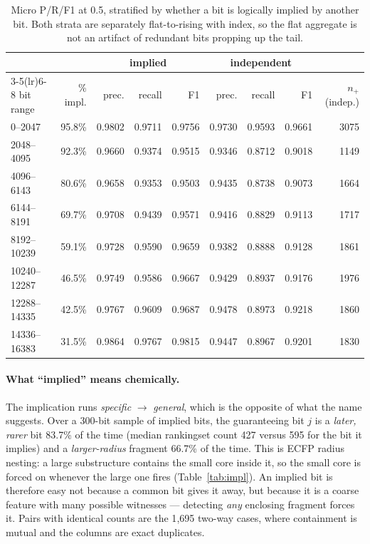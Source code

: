 \documentclass[11pt,a4paper]{article}
\begin{document}
\begin{table}[htbp]
\centering
\small
\caption{Micro P/R/F1 at 0.5, stratified by whether a bit is logically implied by another bit.
Both strata are separately flat-to-rising with index, so the flat aggregate is not an artifact of
redundant bits propping up the tail.}
\label{tab:strat}
\begin{tabular}{lrrrrrrrr}
\toprule
& & \multicolumn{3}{c}{implied} & \multicolumn{3}{c}{independent} & \\
\cmidrule(lr){3-5}\cmidrule(lr){6-8}
bit range & \% impl. & prec. & recall & F1 & prec. & recall & F1 & $n_{+}$ (indep.) \\
\midrule
0--2047 & 95.8\% & 0.9802 & 0.9711 & 0.9756 & 0.9730 & 0.9593 & 0.9661 & 3075 \\
2048--4095 & 92.3\% & 0.9660 & 0.9374 & 0.9515 & 0.9346 & 0.8712 & 0.9018 & 1149 \\
4096--6143 & 80.6\% & 0.9658 & 0.9353 & 0.9503 & 0.9435 & 0.8738 & 0.9073 & 1664 \\
6144--8191 & 69.7\% & 0.9708 & 0.9439 & 0.9571 & 0.9416 & 0.8829 & 0.9113 & 1717 \\
8192--10239 & 59.1\% & 0.9728 & 0.9590 & 0.9659 & 0.9382 & 0.8888 & 0.9128 & 1861 \\
10240--12287 & 46.5\% & 0.9749 & 0.9586 & 0.9667 & 0.9429 & 0.8937 & 0.9176 & 1976 \\
12288--14335 & 42.5\% & 0.9767 & 0.9609 & 0.9687 & 0.9478 & 0.8973 & 0.9218 & 1860 \\
14336--16383 & 31.5\% & 0.9864 & 0.9767 & 0.9815 & 0.9447 & 0.8967 & 0.9201 & 1830 \\
\bottomrule
\end{tabular}
\end{table}

\paragraph{What ``implied'' means chemically.} The implication runs \emph{specific}
$\rightarrow$ \emph{general}, which is the opposite of what the name suggests. Over a 300-bit
sample of implied bits, the guaranteeing bit $j$ is a \emph{later, rarer} bit 83.7\% of the time
(median rankingset count 427 versus 595 for the bit it implies) and a \emph{larger-radius} fragment
66.7\% of the time. This is ECFP radius nesting: a large substructure contains the small core
inside it, so the small core is forced on whenever the large one fires (Table~\ref{tab:impl}).
An implied bit is therefore easy not because a common bit gives it away, but because it is a coarse
feature with many possible witnesses --- detecting \emph{any} enclosing fragment forces it. Pairs
with identical counts are the 1{,}695 two-way cases, where containment is mutual and the columns are
exact duplicates.
\end{document}
